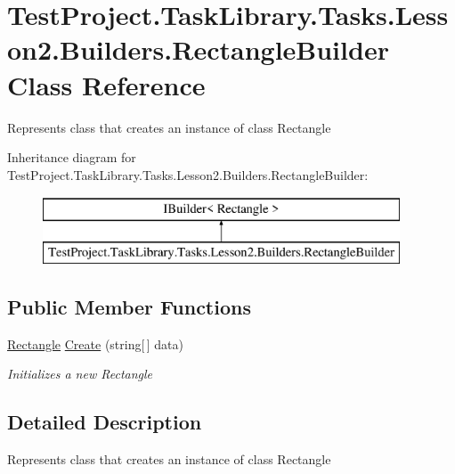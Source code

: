 \hypertarget{class_test_project_1_1_task_library_1_1_tasks_1_1_lesson2_1_1_builders_1_1_rectangle_builder}{}\section{Test\+Project.\+Task\+Library.\+Tasks.\+Lesson2.\+Builders.\+Rectangle\+Builder Class Reference}
\label{class_test_project_1_1_task_library_1_1_tasks_1_1_lesson2_1_1_builders_1_1_rectangle_builder}


Represents class that creates an instance of class Rectangle  


Inheritance diagram for Test\+Project.\+Task\+Library.\+Tasks.\+Lesson2.\+Builders.\+Rectangle\+Builder\+:\begin{figure}[H]
\begin{center}
\leavevmode
\includegraphics[height=2.000000cm]{class_test_project_1_1_task_library_1_1_tasks_1_1_lesson2_1_1_builders_1_1_rectangle_builder}
\end{center}
\end{figure}
\subsection*{Public Member Functions}
\begin{DoxyCompactItemize}
\item 
\mbox{\hyperlink{struct_test_project_1_1_task_library_1_1_tasks_1_1_lesson2_1_1_models_1_1_rectangle}{Rectangle}} \mbox{\hyperlink{class_test_project_1_1_task_library_1_1_tasks_1_1_lesson2_1_1_builders_1_1_rectangle_builder_a3bbb2ea6b6d06e27dafaa8d7d231b8d3}{Create}} (string\mbox{[}$\,$\mbox{]} data)
\begin{DoxyCompactList}\small\item\em Initializes a new Rectangle \end{DoxyCompactList}\end{DoxyCompactItemize}


\subsection{Detailed Description}
Represents class that creates an instance of class Rectangle 



